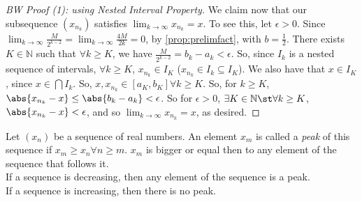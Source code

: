 \documentclass[12pt]{article}
\begin{document}
\begin{proof}[BW Proof (1): using Nested Interval Property]
  We claim now that our subsequence $(x_{n_k})$ satisfies $\lim_{k\to\infty} x_{n_k} = x$. To see this, let $\epsilon > 0$. Since $\lim_{k\to\infty}\frac{M}{2^{k-2}} = \lim_{k\to\infty}\frac{4M}{2k} = 0$, by \cref{prop:prelimfact}, with $b = \frac{1}{2}$. There exists $K \in \mathbb{N}$ such that $\forall k \geq K$, we have $\frac{M}{2^{k-2}} = b_k - a_k < \epsilon$. So, since $I_k$ is a nested sequence of intervals, $\forall k \geq K$, $x_{n_k} \in I_K$ ($x_{n_k} \in I_k \subseteq I_K$). We also have that $x \in I_K$, since $x \in \bigcap I_k$. So, $x, x_{n_k} \in [a_K, b_K] \forall k \geq K$. So, for $k \geq K$, $\abs{x_{n_k} - x} \leq \abs{b_k - a_k} < \epsilon$. So for $\epsilon > 0$, $\exists K \in \mathbb{N} \st \forall k \geq K$, $\abs{x_{n_k}-x} < \epsilon$, and so $\lim_{k\to\infty} x_{n_k} = x$, as desired.
\end{proof}

\begin{definition}[Peak]
  Let $(x_n)$ be a sequence of real numbers.  An element $x_m$ is called a \emph{peak} of this sequence if $x_m \geq x_n \forall n \geq m$. $x_m$ is bigger or equal then to any element of the sequence that follows it.\\
  If a sequence is decreasing, then any element of the sequence is a peak.\\
  If a sequence is increasing, then there is no peak.
\end{definition}


\end{document}
